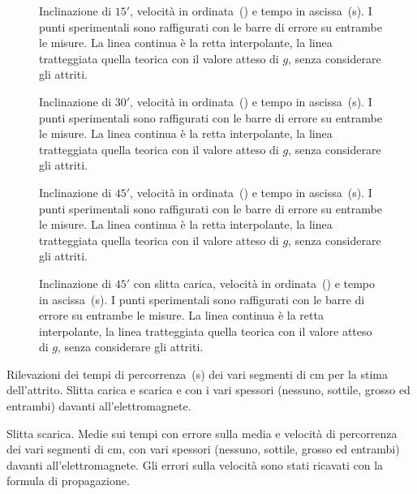 \documentclass[italian,a4paper]{article}
\begin{document}
 \begin {figure}[p]\caption{Inclinazione di $15'$,
velocità in ordinata~() e tempo in ascissa~(s).
I punti sperimentali sono raffigurati con le barre di errore su entrambe le misure. La linea continua è la retta interpolante, la linea tratteggiata quella teorica con il valore atteso di $g$, senza considerare gli attriti.}\label{15graf}
\centering
        
\end{figure}
 \begin {figure}[p]\caption{Inclinazione di $30'$,
velocità in ordinata~() e tempo in ascissa~(s).
I punti sperimentali sono raffigurati con le barre di errore su entrambe le misure. La linea continua è la retta interpolante, la linea tratteggiata quella teorica con il valore atteso di $g$, senza considerare gli attriti.}\label{30graf}
\centering
        
\end{figure}
 \begin {figure}[p]\caption{Inclinazione di $45'$,
velocità in ordinata~() e tempo in ascissa~(s).
I punti sperimentali sono raffigurati con le barre di errore su entrambe le misure. La linea continua è la retta interpolante, la linea tratteggiata quella teorica con il valore atteso di $g$, senza considerare gli attriti.}\label{45graf}
\centering
        
\end{figure}
 \begin {figure}[p]\caption{Inclinazione di $45'$ con slitta carica,
velocità in ordinata~() e tempo in ascissa~(s).
I punti sperimentali sono raffigurati con le barre di errore su entrambe le misure. La linea continua è la retta interpolante, la linea tratteggiata quella teorica con il valore atteso di $g$, senza considerare gli attriti.}\label{45cgraf}
\centering
        
\end{figure}
\begin{table}[p]\caption{Rilevazioni dei tempi di percorrenza~(s) dei vari segmenti di \unit[20]{cm} per la stima dell'attrito. Slitta carica e scarica e con i vari spessori (nessuno, sottile, grosso ed entrambi) davanti all'elettromagnete.}\label{tabattrito}
 \centering \small
 
\end{table}
\begin{table}[p]\caption{Slitta scarica. Medie sui tempi con errore sulla media e velocità di percorrenza dei vari segmenti di \unit[20]{cm}, con vari spessori (nessuno, sottile, grosso ed entrambi) davanti all'elettromagnete. Gli errori sulla velocità sono stati ricavati con la formula di propagazione.}\label{tabtvscarica}
 \centering \small
 
\end{table}
\end{document}
